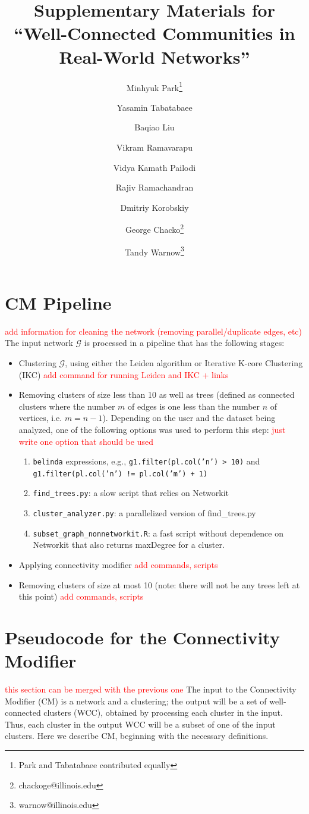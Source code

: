 \documentclass[a4paper]{article}   	%
\title{Supplementary Materials for ``Well-Connected Communities in Real-World Networks''}
\author[1]{Minhyuk Park\thanks{Park and Tabatabaee contributed equally}}
\author[1]{Yasamin Tabatabaee}
\author[1]{Baqiao Liu}
\author[1]{Vikram Ramavarapu}
\author[1]{Vidya Kamath Pailodi}
\author[1]{Rajiv Ramachandran}
\author[2]{Dmitriy Korobskiy}
\author[1,3]{George Chacko\thanks{chackoge@illinois.edu}}
\author[1]{Tandy Warnow\thanks{warnow@illinois.edu}}
\affil[1]{Department of Computer Science, University of Illinois Urbana-Champaign, Urbana, IL 61801}
\affil[2]{NTT DATA, McLean, VA 22102}
\affil[3]{Office of Research, Grainger College of Engineering, University of Illinois Urbana-Champaign, Urbana, IL 61801}
\begin{document}
\maketitle
\tableofcontents
\listoffigures
\listoftables
\newpage


\section{CM Pipeline}

\textcolor{red}{add information for cleaning the network (removing parallel/duplicate edges, etc)}
The input network $\mathcal{G}$ is processed in a pipeline that has the following stages:
\begin{itemize}
\item Clustering $\mathcal{G}$, using either the Leiden algorithm or Iterative K-core Clustering (IKC) \textcolor{red}{add command for running Leiden and IKC + links}
\item Removing clusters of size less than 10 as well as trees (defined as connected clusters where the number $m$ of edges is one less than the number $n$ of vertices, i.e. $m=n-1$). Depending on the user and the dataset being analyzed, one of the following options was used to perform this step: \textcolor{red}{just write one option that should be used}
\begin{enumerate}
\item \texttt{belinda} \citep{belinda2022} expressions, e.g., \texttt{g1.filter(pl.col('n') > 10)} and \texttt{g1.filter(pl.col('n') != pl.col('m') + 1)}
\item \texttt{find\_trees.py}: a slow script that relies on Networkit \citep{Staudt2016}
\item \texttt{cluster\_analyzer.py}: a parallelized version of find\_trees.py
\item \texttt{subset\_graph\_nonnetworkit.R}: a fast script without dependence on Networkit that also returns maxDegree for a cluster.
\end{enumerate}
\item Applying connectivity modifier  \textcolor{red}{add commands, scripts}
\item Removing clusters of size at most 10  (note: there will not be any trees left at this point) \textcolor{red}{add commands, scripts}
\end{itemize}



\section{Pseudocode for the Connectivity Modifier}
\textcolor{red}{this section can be merged with the previous one}
The input to the Connectivity Modifier (CM) is a network and a  clustering; the output will be a set of well-connected clusters (WCC), obtained
by processing each cluster in the input.
Thus, each cluster in the output WCC will be a subset of one of the input clusters.
Here we describe CM, beginning  with the necessary definitions.
\end{document}
